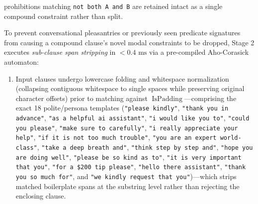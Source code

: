 \documentclass[conference,10pt]{IEEEtran}
\begin{document}
prohibitions matching \texttt{not both A and B} are retained intact as a single compound constraint rather than split.

To prevent conversational pleasantries or previously seen predicate signatures from causing a compound clause's novel modal constraints to be dropped, Stage 2 executes \textit{sub-clause span stripping} in $< 0.4\text{ ms}$ via a pre-compiled Aho-Corasick automaton:
\begin{enumerate}
    \item Input clauses undergo lowercase folding and whitespace normalization (collapsing contiguous whitespace to single spaces while preserving original character offsets) prior to matching against $\operatorname{IsPadding}$---comprising the exact 18 polite/persona templates (\texttt{"please kindly"}, \texttt{"thank you in advance"}, \texttt{"as a helpful ai assistant"}, \texttt{"i would like you to"}, \texttt{"could you please"}, \texttt{"make sure to carefully"}, \texttt{"i really appreciate your help"}, \texttt{"if it is not too much trouble"}, \texttt{"you are an expert world-class"}, \texttt{"take a deep breath and"}, \texttt{"think step by step and"}, \texttt{"hope you are doing well"}, \texttt{"please be so kind as to"}, \texttt{"it is very important that you"}, \texttt{"for a \$200 tip please"}, \texttt{"hello there assistant"}, \texttt{"thank you so much for"}, and \texttt{"we kindly request that you"})---which strips matched boilerplate spans at the substring level rather than rejecting the enclosing clause.

\end{enumerate}
\end{document}
